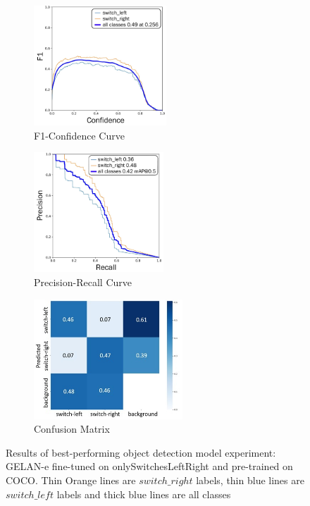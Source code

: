 \begin{figure}[H]
    \centering
    \begin{subfigure}{0.32\textwidth}
        \centering
        \includegraphics[width=\linewidth,height=4.5cm,keepaspectratio]{PICs/experiments/objectdetectionExperiment/F1_curve_updated.jpg}
        \caption{F1-Confidence Curve}
        \label{fig:objectDetectionResultsMetrics_a}
    \end{subfigure}
    \begin{subfigure}{0.32\textwidth}
        \centering
        \includegraphics[width=\linewidth,height=4.5cm,keepaspectratio]{PICs/experiments/objectdetectionExperiment/PR_curve_updated.jpg}
        \caption{Precision-Recall Curve}
        \label{fig:objectDetectionResultsMetrics_b}
    \end{subfigure}
    \begin{subfigure}{0.32\textwidth}
        \centering
        \includegraphics[width=\linewidth,height=4.5cm,keepaspectratio]{PICs/experiments/objectdetectionExperiment/confusion_matrix_updated.jpg}
        \caption{Confusion Matrix}
        \label{fig:objectDetectionResultsMetrics_c}
    \end{subfigure}
    \caption{Results of best-performing object detection model experiment: \ac{GELAN}-e fine-tuned on onlySwitchesLeftRight and pre-trained on COCO.
    Thin Orange lines are $switch\_right$ labels, thin blue lines are $switch\_left$ labels and thick blue lines are all classes}
    \label{fig:objectDetectionResultsMetrics}
\end{figure}


